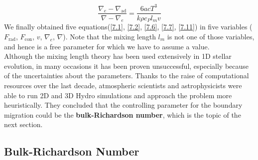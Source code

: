 \begin{equation}\label{7.11}
\frac{\nabla_e - \nabla_{\mathrm{ad}}}{\nabla - \nabla_e} = \frac{6acT^3}{k \rho c_P l_m v}
\end{equation}
We finally obtained five equations(\ref{7.1}, \ref{7.2}, \ref{7.6}, \ref{7.7}, \ref{7.11}) in five variables ($F_{\mathrm{rad}}$, $F_{\mathrm{con}}$, $v$, $\nabla_e$, $\nabla$). Note that the mixing length $l_m$ is not one of those variables, and hence is a free parameter for which we have to assume a value. \\
Although the mixing length theory has been used extensively in 1D stellar evolution, in many occasions it has been proven unsuccessful, especially because of the uncertainties about the parameters. Thanks to the raise of computational resources over the last decade, atmospheric scientists and astrophysicists were able to run 2D and 3D Hydro simulations and approach the problem more heuristically. They concluded that the controlling parameter for the boundary migration could be the \textbf{bulk-Richardson number}, which is the topic of the next section.  


\subsection{Bulk-Richardson Number}

